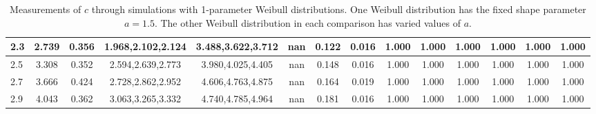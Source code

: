 \begin{table*}[h!]
\begin{center}
\begin{tabular}{| l | c | c | c | c | c | c | c | c | c | c | c | c | c |}
2.3 & 2.739 & 0.356 & 1.968,2.102,2.124 & 3.488,3.622,3.712  & nan  & 0.122  & 0.016  & 1.000  & 1.000  & 1.000  & 1.000  & 1.000  & 1.000 \\\hline
2.5 & 3.308 & 0.352 & 2.594,2.639,2.773 & 3.980,4.025,4.405  & nan  & 0.148  & 0.016  & 1.000  & 1.000  & 1.000  & 1.000  & 1.000  & 1.000 \\\hline
2.7 & 3.666 & 0.424 & 2.728,2.862,2.952 & 4.606,4.763,4.875  & nan  & 0.164  & 0.019  & 1.000  & 1.000  & 1.000  & 1.000  & 1.000  & 1.000 \\\hline
2.9 & 4.043 & 0.362 & 3.063,3.265,3.332 & 4.740,4.785,4.964  & nan  & 0.181  & 0.016  & 1.000  & 1.000  & 1.000  & 1.000  & 1.000  & 1.000 \\\hline
\end{tabular}
\caption{Measurements of $c$ through simulations
        with 1-parameter Weibull distributions.
        One Weibull distribution has the fixed shape parameter $a=1.5$.
        The other Weibull distribution in each comparison
        has varied values of $a$.}
\end{center}
\end{table*}